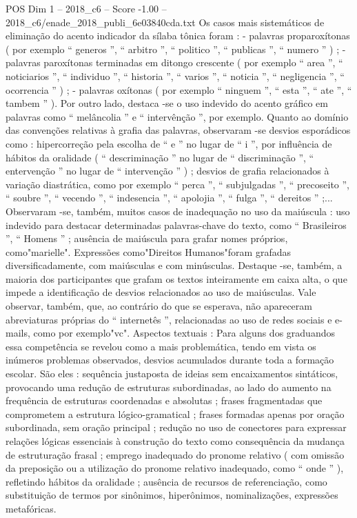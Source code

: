 \begin{textsample}{POS Dim 1 – 2018\_c6 – Score -1.00 – 2018\_c6/enade\_2018\_publi\_6e03840cda.txt}
Os casos mais sistemáticos de eliminação do acento indicador da sílaba tônica foram : - palavras proparoxítonas ( por exemplo “ generos ”, “ arbitro ”, “ politico ”, “ publicas ”, “ numero ” ) ; - palavras paroxítonas terminadas em ditongo crescente ( por exemplo “ area ”, “ noticiarios ”, “ individuo ”, “ historia ”, “ varios ”, “ noticia ”, “ negligencia ”, “ ocorrencia ” ) ; - palavras oxítonas ( por exemplo “ ninguem ”, “ esta ”, “ ate ”, “ tambem ” ).
Por outro lado, destaca -se o uso indevido do acento gráfico em palavras como “ melâncolia ” e “ intervênção ”, por exemplo.
Quanto ao domínio das convenções relativas à grafia das palavras, observaram -se desvios esporádicos como : hipercorreção pela escolha de “ e ” no lugar de “ i ”, por influência de hábitos da oralidade ( “ descriminação ” no lugar de “ discriminação ”, “ entervenção ” no lugar de “ intervenção ” ) ; desvios de grafia relacionados à variação diastrática, como por exemplo “ perca ”, “ subjulgadas ”, “ precoseito ”, “ soubre ”, “ vecendo ”, “ indesencia ”, “ apolojia ”, “ fulga ”, “ dereitos ” ;...
Observaram -se, também, muitos casos de inadequação no uso da maiúscula : uso indevido para destacar determinadas palavras-chave do texto, como “ Brasileiros ”, “ Homens ” ; ausência de maiúscula para grafar nomes próprios, como"marielle".
Expressões como"Direitos Humanos"foram grafadas diversificadamente, com maiúsculas e com minúsculas.
Destaque -se, também, a maioria dos participantes que grafam os textos inteiramente em caixa alta, o que impede a identificação de desvios relacionados ao uso de maiúsculas.
Vale observar, também, que, ao contrário do que se esperava, não apareceram abreviaturas próprias do “ internetês ”, relacionadas ao uso de redes sociais e e-mails, como por exemplo"vc".
Aspectos textuais : Para alguns dos graduandos essa competência se revelou como a mais problemática, tendo em vista os inúmeros problemas observados, desvios acumulados durante toda a formação escolar.
São eles : sequência justaposta de ideias sem encaixamentos sintáticos, provocando uma redução de estruturas subordinadas, ao lado do aumento na frequência de estruturas coordenadas e absolutas ; frases fragmentadas que comprometem a estrutura lógico-gramatical ; frases formadas apenas por oração subordinada, sem oração principal ; redução no uso de conectores para expressar relações lógicas essenciais à construção do texto como consequência da mudança de estruturação frasal ; emprego inadequado do pronome relativo ( com omissão da preposição ou a utilização do pronome relativo inadequado, como “ onde ” ), refletindo hábitos da oralidade ; ausência de recursos de referenciação, como substituição de termos por sinônimos, hiperônimos, nominalizações, expressões metafóricas.

\end{textsample}
